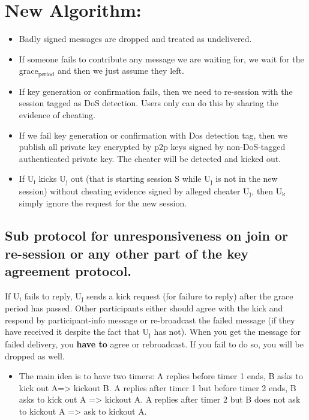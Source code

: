 \documentclass[11pt]{article}
\begin{document}
\section{New Algorithm:}
\label{sec-8}
\begin{itemize}
\item Badly signed messages are dropped and treated as undelivered.
\item If someone fails to contribute any message we are waiting for, we wait for the grace$_{\text{period}}$
    and then we just assume they left.
\item If key generation or confirmation fails, then we need to re-session with the session
tagged as DoS detection. Users only can do this by sharing the evidence of cheating.
\item If we fail key generation or confirmation with Dos detection tag, then we publish
all private key encrypted by p2p keys signed by non-DoS-tagged authenticated
private key. The cheater will be detected and kicked out.
\item If U$_{\text{i}}$ kicks U$_{\text{j}}$ out (that is starting session S while U$_{\text{j}}$ is not in the
new session) without cheating evidence signed by alleged cheater U$_{\text{j}}$, then U$_{\text{k}}$ simply ignore the request
for the new session.
\end{itemize}

\subsection{Sub protocol for unresponsiveness on join or re-session or any other part of the key agreement protocol.}
\label{sec-8-1}
If U$_{\text{i}}$ fails to reply, U$_{\text{j}}$ sends a kick request (for failure to reply) after the grace period has passed.
Other participants either should agree with the kick and respond by participant-info message or re-broadcast the failed message (if they have received it despite the fact that U$_{\text{j}}$ has not). When
you get the message for failed delivery, you \textbf{have to} agree or rebroadcast. If you fail to do so, you will be dropped as well.

\begin{itemize}
\item The main idea is to have two timers:
A replies before timer 1 ends, B asks to kick out A=> kickout B.
A replies after timer 1 but before timer 2 ends, B asks to kick out A => kickout A.
A replies after timer 2 but B does not ask to kickout A => ask to kickout A.
\end{itemize}
\end{document}
